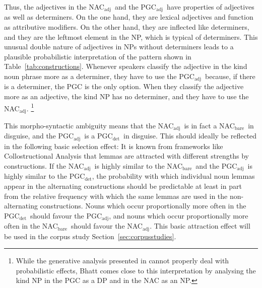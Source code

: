 \documentclass[USenglish]{article}
\newcommand{\Sub}[1]{\ensuremath{\mathrm{_{#1}}}}
\newcommand{\NACb}{NAC\Sub{bare}}
\newcommand{\NACa}{NAC\Sub{adj}}
\newcommand{\PGCd}{PGC\Sub{det}}
\newcommand{\PGCa}{PGC\Sub{adj}}
\begin{document}
\begin{exe}
  \ex\label{ex:starkschwach} 
  \begin{xlist}
  \end{xlist}
\end{exe}

Thus, the adjectives in the \NACa\ and the \PGCa\ have properties of adjectives as well as determiners.
On the one hand, they are lexical adjectives and function as attributive modifiers.
On the other hand, they are inflected like determiners, and they are the leftmost element in the NP, which is typical of determiners.
This unusual double nature of adjectives in NPs without determiners leads to a plausible probabilistic interpretation of the pattern shown in Table~\ref{tab:constructions}.
Whenever speakers classify the adjective in the kind noun phrase more as a determiner, they have to use the \PGCa\ because, if there is a determiner, the PGC is the only option.
When they classify the adjective more as an adjective, the kind NP has no determiner, and they have to use the \NACa.%
\footnote{While the generative analysis presented in \cite{Bhatt1990} cannot properly deal with probabilistic effects, Bhatt comes close to this interpretation by analysing the kind NP in the PGC as a DP and in the NAC as an NP.}

This morpho-syntactic ambiguity means that the \NACa\ is in fact a \NACb\ in disguise, and the \PGCa\ is a \PGCd\ in disguise.
This should ideally be reflected in the following basic selection effect:
It is known from frameworks like Collostructional Analysis \citep{GriesStefanowitsch2004} that lemmas are attracted with different strengths by constructions.
If the \NACa\ is highly similar to the \NACb\ and the \PGCa\ is highly similar to the \PGCd, the probability with which individual noun lemmas appear in the alternating constructions should be predictable at least in part from the relative frequency with which the same lemmas are used in the non-alternating constructions.
Nouns which occur proportionally more often in the \PGCd\ should favour the \PGCa, and nouns which occur proportionally more often in the \NACb\ should favour the \NACa.
This basic attraction effect will be used in the corpus study Section~\ref{sec:corpusstudies}.
\end{document}

